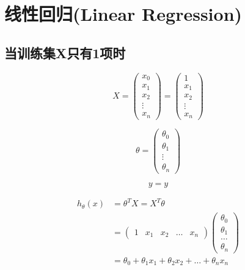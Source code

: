 \section{线性回归(Linear Regression)}
\subsection{当训练集X只有1项时}
   
\begin{equation}
	X = \left(\begin{matrix}
			x_0 \\ x_1 \\ x_2 \\ \vdots \\ x_n
		\end{matrix}\right)
	= \left(\begin{matrix}
			1 \\ x_1 \\ x_2 \\ \vdots \\ x_n
		\end{matrix}\right)
\end{equation}


\begin{equation}
	\theta = \left(\begin{matrix}
			\theta_0 \\ \theta_1 \\ \vdots \\ \theta_n
		\end{matrix}\right)
\end{equation}


\begin{equation}
y = y
\end{equation}


\begin{equation} \begin{aligned}
	h_\theta(x) & = \theta^{T}X = X^T\theta \\
	& = \left( \begin{matrix}
			1 & x_1 & x_2 & \dots & x_n
		\end{matrix}\right)
		\left(\begin{matrix}
			\theta_0 \\
			\theta_1 \\
			\dots \\
			\theta_n
		\end{matrix}\right) \\
	& = \theta_0 + \theta_1x_1 + \theta_2x_2 + \dots + \theta_nx_n
\end{aligned} \end{equation}





